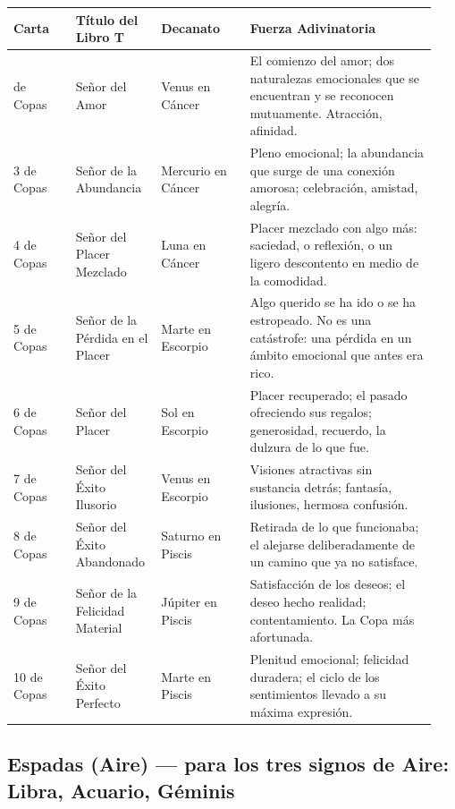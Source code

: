 \begin{longtable}[]{@{}>{\RaggedRight\small}p{0.14\linewidth}>{\RaggedRight\small}p{0.18\linewidth}>{\RaggedRight\small}p{0.20\linewidth}>{\RaggedRight\small}p{0.42\linewidth}@{}}
\toprule\noalign{}
Carta & Título del Libro T & Decanato & Fuerza Adivinatoria \\
\midrule\noalign{}
\endhead
\bottomrule\noalign{}
\endlastfoot
2 de Copas & Señor del Amor & Venus en Cáncer & El comienzo del amor; dos naturalezas emocionales que se encuentran y se reconocen mutuamente. Atracción, afinidad. \\
3 de Copas & Señor de la Abundancia & Mercurio en Cáncer & Pleno emocional; la abundancia que surge de una conexión amorosa; celebración, amistad, alegría. \\
4 de Copas & Señor del Placer Mezclado & Luna en Cáncer & Placer mezclado con algo más: saciedad, o reflexión, o un ligero descontento en medio de la comodidad. \\
5 de Copas & Señor de la Pérdida en el Placer & Marte en Escorpio & Algo querido se ha ido o se ha estropeado. No es una catástrofe: una pérdida en un ámbito emocional que antes era rico. \\
6 de Copas & Señor del Placer & Sol en Escorpio & Placer recuperado; el pasado ofreciendo sus regalos; generosidad, recuerdo, la dulzura de lo que fue. \\
7 de Copas & Señor del Éxito Ilusorio & Venus en Escorpio & Visiones atractivas sin sustancia detrás; fantasía, ilusiones, hermosa confusión. \\
8 de Copas & Señor del Éxito Abandonado & Saturno en Piscis & Retirada de lo que funcionaba; el alejarse deliberadamente de un camino que ya no satisface. \\
9 de Copas & Señor de la Felicidad Material & Júpiter en Piscis & Satisfacción de los deseos; el deseo hecho realidad; contentamiento. La Copa más afortunada. \\
10 de Copas & Señor del Éxito Perfecto & Marte en Piscis & Plenitud emocional; felicidad duradera; el ciclo de los sentimientos llevado a su máxima expresión. \\
\end{longtable}

\subsection{Espadas (Aire) --- para los tres signos de Aire: Libra, Acuario, Géminis}\label{swords-air--suits-the-three-air-signs-libra-aquarius-gemini}

